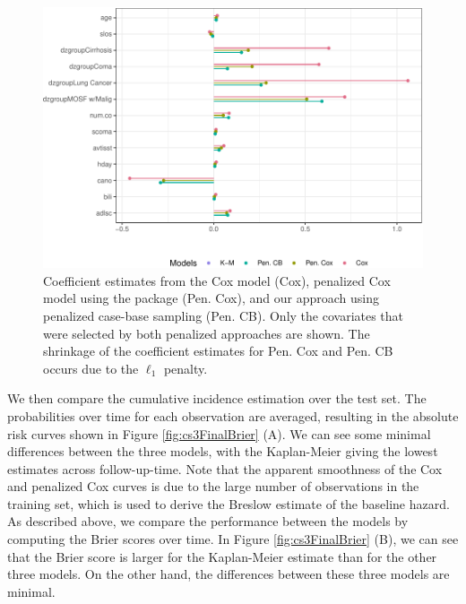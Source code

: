 \begin{Schunk}
\begin{figure}[ht]
\includegraphics[width=\textwidth,keepaspectratio=true]{./coefplots-1} \caption{\label{fig:cs3lolliPlot} Coefficient estimates from the Cox model (Cox), penalized Cox model using the  package (Pen. Cox), and our approach using penalized case-base sampling (Pen. CB). Only the covariates that were selected by both penalized approaches are shown. The shrinkage of the coefficient estimates for Pen. Cox and Pen. CB occurs due to the $\ell_1$ penalty.}\label{fig:coefplots}
\end{figure}
\end{Schunk}

We then compare the cumulative incidence estimation over the test set.
The probabilities over time for each observation are averaged, resulting
in the absolute risk curves shown in Figure \ref{fig:cs3FinalBrier} (A).
We can see some minimal differences between the three models, with the
Kaplan-Meier giving the lowest estimates across follow-up-time. Note
that the apparent smoothness of the Cox and penalized Cox curves is due
to the large number of observations in the training set, which is used
to derive the Breslow estimate of the baseline hazard. As described
above, we compare the performance between the models by computing the
Brier scores over time. In Figure \ref{fig:cs3FinalBrier} (B), we can
see that the Brier score is larger for the Kaplan-Meier estimate than
for the other three models. On the other hand, the differences between
these three models are minimal.

